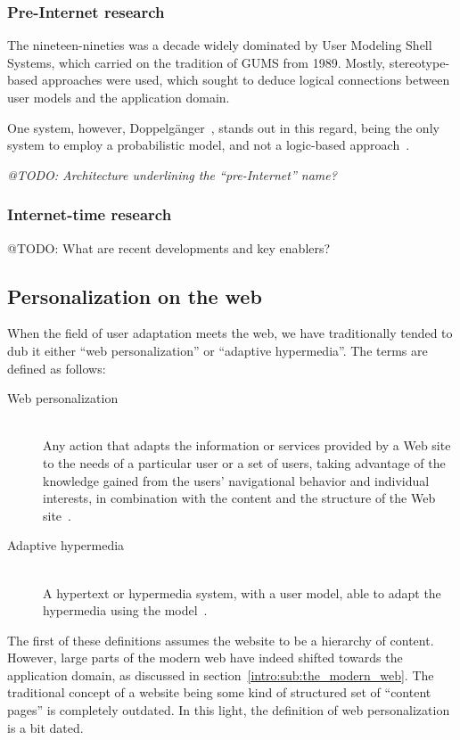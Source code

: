 \subsubsection{Pre-Internet research}

The nineteen-nineties was a decade widely dominated by User Modeling Shell Systems, which carried on the tradition of GUMS from 1989. Mostly, stereotype-based approaches were used, which sought to deduce logical connections between user models and the application domain.

One system, however, Doppelgänger~\cite{Orwant1995}, stands out in this regard, being the only system to employ a probabilistic model, and not a logic-based approach~\cite{Kobsa2001,Pohl1997,Pohl1999}.

\emph{@TODO: Architecture underlining the ``pre-Internet'' name?}

\subsubsection{Internet-time research}

@TODO: What are recent developments and key enablers?

\subsection{Personalization on the web}
\label{survey:sub:web_personalization}

When the field of user adaptation meets the web, we have traditionally tended to dub it either ``web personalization'' or ``adaptive hypermedia''. The terms are defined as follows:

\begin{description}
    \item[Web personalization] \hfill \\
      Any action that adapts the information or services provided by a Web site to the needs of a particular user or a set of users, taking advantage of the knowledge gained from the users' navigational behavior and individual interests, in combination with the content and the structure of the Web site~\cite{Eirinaki2003}.
    \item[Adaptive hypermedia] \hfill \\
      A hypertext or hypermedia system, with a user model, able to adapt the hypermedia using the model~\cite{Brusilovsky1996}.
\end{description}

The first of these definitions assumes the website to be a hierarchy of content. However, large parts of the modern web have indeed shifted towards the application domain, as discussed in section~\ref{intro:sub:the_modern_web}. The traditional concept of a website being some kind of structured set of ``content pages'' is completely outdated. In this light, the definition of web personalization is a bit dated.

